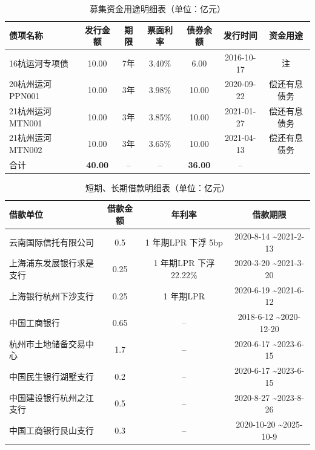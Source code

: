 \documentclass[H:\workspace\担保人财务信息2\杭州大运河\HangZhouText.tex]{subfiles}
\begin{document}
\begin{table}[H]
    \xiaowuhao 
    \centering 
    \setlength{\tabcolsep}{1.2em} %
    {\renewcommand{\arraystretch}{0.5} %
    \begin{tabular}{@{}l|c|c|c|c|c|c@{}}
        \toprule 
        债项名称 & 发行金额 & 期限 & 票面利率 & 债券余额 & 发行时间 & 资金用途\\
        \midrule 
        16杭运河专项债 & 10.00 & 7年 & 3.40\% & 6.00 & 2016-10-17 & 注\footnotemark \\
        20杭州运河PPN001 & 10.00 & 3年 & 3.98\% & 10.00 & 2020-09-22 & 偿还有息债务 \\ 
        21杭州运河MTN001 & 10.00 & 3年 & 3.85\% & 10.00 & 2021-01-27 & 偿还有息债务\\
        21杭州运河MTN002 & 10.00 & 3年 & 3.65\% & 10.00 & 2021-04-13 & 偿还有息债务\\
        \midrule  
        合计 & \textbf{40.00} & -- & -- & \textbf{36.00} & -- \\
        \bottomrule 
    \end{tabular}
    }
    \caption{募集资金用途明细表（单位：亿元）}
\end{table}

\begin{table}[H]
    \centering 
    \xiaowuhao 
    \setlength{\tabcolsep}{1.2em} %
    {\renewcommand{\arraystretch}{0.5} %
    \begin{tabular}{@{}l|c|c|c@{}}
        \toprule 
        借款单位 & 借款金额 & 年利率 & 借款期限 \\
        \midrule 
        云南国际信托有限公司 & 0.5 & 1 年期LPR 下浮 5bp & 2020-8-14 \textasciitilde 2021-2-13 \\
        上海浦东发展银行求是支行 & 0.25 & 1 年期LPR 下浮 22.22\% & 2020-3-20 \textasciitilde 2021-3-20 \\
        上海银行杭州下沙支行 & 0.25 & 1 年期LPR & 2020-6-19 \textasciitilde 2021-6-12 \\
        中国工商银行 & 0.65 & -- & 2018-6-12 \textasciitilde 2020-12-20 \\
        杭州市土地储备交易中心 & 1.7 & -- & 2020-6-17 \textasciitilde 2023-6-15 \\
        中国民生银行湖墅支行 & 0.2 & -- & 2020-6-17 \textasciitilde 2023-6-15 \\
        中国建设银行杭州之江支行 & 0.5 & -- & 2020-8-27 \textasciitilde 2023-8-26 \\
        中国工商银行艮山支行 & 0.3 & -- & 2020-10-20 \textasciitilde 2025-10-9 \\
        \bottomrule 
    \end{tabular}
    }
    \caption{短期、长期借款明细表（单位：亿元）}
\end{table}  
\end{document}
